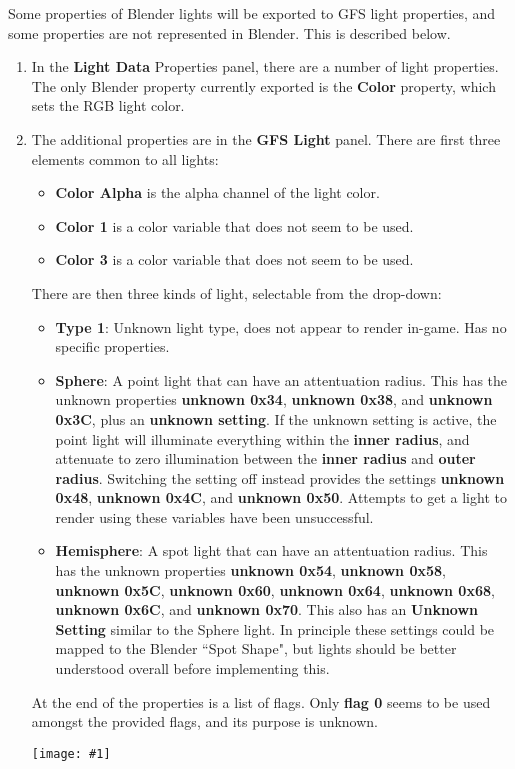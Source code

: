 \documentclass{article}
\newenvironment{guide}[1]
{
	\begin{center}
		\begin{tcolorbox}[%
			colback=black!20, 
			boxrule=0pt, 
			title=Step-by-step: #1,
			enhanced,
			breakable,
			overlay unbroken={%
                \draw[line width=1pt, black, rounded corners]
        	    (frame.north west) rectangle (frame.south east);
			},
    		overlay first={%
        		 \draw[line width=1pt, black, rounded corners]
        	    (frame.south west) -- (frame.north west) -- (frame.north east) -- (frame.south east);
                \draw[line width=1pt, black]
                (frame.south west) -- (frame.south east);
            },
    		overlay middle={%
                \draw[line width=1pt, black]
        	    (frame.north west) rectangle (frame.south east);
        	},
    		overlay last={%
                \draw[line width=1pt, black, rounded corners]
        	    (frame.north west) -- (frame.south west) -- (frame.south east) -- (frame.north east);
                \draw[line width=1pt, black]
                (frame.north west) -- (frame.north east);
           	}
        ]{}
    	\begin{enumerate}
}
{
    		\end{enumerate}
    	\end{tcolorbox}
	\end{center}  	 
}
\newcommand{\guideimage}[1]
{
	\begin{center}
		\texttt{[image: \#1]}
	\end{center}
}
\begin{document}
Some properties of Blender lights will be exported to GFS light properties, and some properties are not represented in Blender. This is described below.
\begin{guide}{Accessing Light Properties}
\item In the \textbf{Light Data} Properties panel, there are a number of light properties.
The only Blender property currently exported is the \textbf{Color} property, which sets the RGB light color.
\item The additional properties are in the \textbf{GFS Light} panel. There are first three elements common to all lights:
\begin{itemize}
\item \textbf{Color Alpha} is the alpha channel of the light color.
\item \textbf{Color 1} is a color variable that does not seem to be used.
\item \textbf{Color 3} is a color variable that does not seem to be used.
\end{itemize}
There are then three kinds of light, selectable from the drop-down:
\begin{itemize}
\item \textbf{Type 1}: Unknown light type, does not appear to render in-game. Has no specific properties.
\item \textbf{Sphere}: A point light that can have an attentuation radius. This has the unknown properties \textbf{unknown 0x34}, \textbf{unknown 0x38}, and \textbf{unknown 0x3C}, plus an \textbf{unknown setting}. If the unknown setting is active, the point light will illuminate everything within the \textbf{inner radius}, and attenuate to zero illumination between the \textbf{inner radius} and \textbf{outer radius}. Switching the setting off instead provides the settings \textbf{unknown 0x48}, \textbf{unknown 0x4C}, and \textbf{unknown 0x50}. Attempts to get a light to render using these variables have been unsuccessful.
\item \textbf{Hemisphere}: A spot light that can have an attentuation radius. This has the unknown properties \textbf{unknown 0x54}, \textbf{unknown 0x58}, \textbf{unknown 0x5C}, \textbf{unknown 0x60}, \textbf{unknown 0x64}, \textbf{unknown 0x68}, \textbf{unknown 0x6C}, and \textbf{unknown 0x70}. This also has an \textbf{Unknown Setting} similar to the Sphere light. In principle these settings could be mapped to the Blender ``Spot Shape", but lights should be better understood overall before implementing this.
\end{itemize}
At the end of the properties is a list of flags. Only \textbf{flag 0} seems to be used amongst the provided flags, and its purpose is unknown.
\guideimage{images/editing_models/edits_light_properties.png}
\end{guide}
\end{document}

